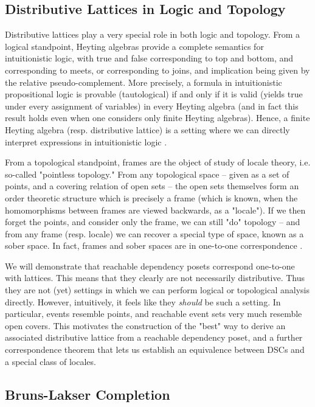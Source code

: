 \documentclass[hoptionsi,review,format=acmsmall]{acmart}
\theoremstyle{definition}
\begin{document}
\subsection{Distributive Lattices in Logic and Topology}

Distributive lattices play a very special role in both logic and topology. From a logical standpoint, Heyting algebras provide a complete semantics for intuitionistic logic, with true and false corresponding to top and bottom, and corresponding to meets, or corresponding to joins, and implication being given by the relative pseudo-complement. More precisely, a formula in intuitionistic propositional logic is provable (tautological) if and only if it is valid (yields true under every assignment of variables) in every Heyting algebra (and in fact this result holds even when one considers only finite Heyting algebras). Hence, a finite Heyting algebra (resp. distributive lattice) is a setting where we can directly interpret expressions in intuitionistic logic \cite{van1988troelstra}.

From a topological standpoint, frames are the object of study of locale theory, i.e. so-called "pointless topology." From any topological space -- given as a set of points, and a covering relation of open sets -- the open sets themselves form an order theoretic structure which is precisely a frame (which is known, when the homomorphisms between frames are viewed backwards, as a "locale"). If we then forget the points, and consider only the frame, we can still "do" topology -- and from any frame (resp. locale) we can recover a special type of space, known as a sober space. In fact, frames and sober spaces are in one-to-one correspondence \cite{johnstone1982stone, vickers1996topology}.

We will demonstrate that reachable dependency posets correspond one-to-one with lattices. This means that they clearly are not necessarily distributive. Thus they are not (yet) settings in which we can perform logical or topological analysis directly. However, intuitively, it feels like they \textit{should} be such a setting. In particular, events resemble points, and reachable event sets very much resemble open covers. This motivates the construction of the "best" way to derive an associated distributive lattice from a reachable dependency poset, and a further correspondence theorem that lets us establish an equivalence between DSCs and a special class of locales.

\subsection{Bruns-Lakser Completion}
\end{document}
